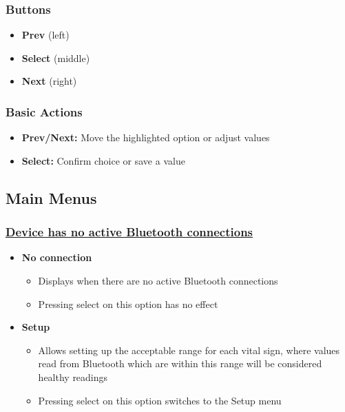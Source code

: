 \subsubsection{Buttons}
\begin{itemize}
	\item \textbf{Prev} (left)
	\item \textbf{Select} (middle)
	\item \textbf{Next} (right)
\end{itemize}
\subsubsection{Basic Actions}
\begin{itemize}
	\item \textbf{Prev/Next:} Move the highlighted option or adjust values
	\item \textbf{Select:} Confirm choice or save a value
\end{itemize}

\subsection{Main Menus}
\subsubsection{\underline{Device has no active Bluetooth connections}}
\begin{itemize}
	\item \textbf{No connection}
	\begin{itemize}
		\item Displays when there are no active Bluetooth connections
		\item Pressing select on this option has no effect
	\end{itemize}
	\item \textbf{Setup}
	\begin {itemize}
		\item Allows setting up the acceptable range for each vital sign, where values read from Bluetooth which are within this range will be considered healthy readings
		\item Pressing select on this option switches to the Setup menu
	\end{itemize}
\end{itemize}
